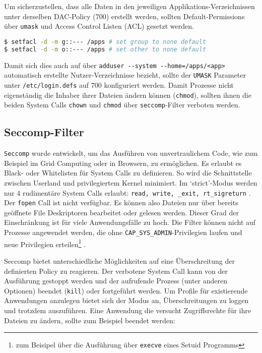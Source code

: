 Um sicherzustellen, dass alle Daten in den jeweiligen Applikations-Verzeichnissen unter derselben DAC-Policy (700) erstellt werden, sollten Default-Permissions über \texttt{umask} und Access Control Listen (ACL) gesetzt werden. 

\begin{lstlisting}[language=bash]
$ setfacl -d -m g::--- /apps # set group to none default
$ setfacl -d -m o::--- /apps # set other to none default
\end{lstlisting}

Damit sich dies auch auf über \texttt{adduser -{}-system -{}-home=/apps/<app>} automatisch erstellte Nutzer-Verzeichnisse bezieht, sollte der \texttt{UMASK} Parameter unter \texttt{/etc/login.defs} auf 700 konfiguriert werden. Damit Prozesse nicht eigenständig die Inhaber ihrer Dateien ändern können (\texttt{chmod}), sollten ihnen die beiden System Calls \texttt{chown} und \texttt{chmod} über \texttt{seccomp}-Filter verboten werden. 

\subsection{Seccomp-Filter}
\label{sec:seccomp}

\texttt{Seccomp} wurde entwickelt, um das Ausführen von unvertraulichem Code, wie zum Beispiel im Grid Computing oder in Browsern, zu ermöglichen. Es erlaubt es Black- oder Whitelisten für System Calls zu definieren. So wird die Schnittstelle zwischen Userland und privilegiertem Kernel minimiert.
Im `strict'-Modus werden nur 4 rudimentäre System Calls erlaubt: \texttt{read, write, \_exit, rt\_sigreturn} \cite{man-seccomp}. Der \texttt{fopen} Call ist nicht verfügbar. Es können also Dateien nur über bereits geöffnete File Deskriptoren bearbeitet oder gelesen werden. Dieser Grad der Einschränkung ist für viele Anwendungsfälle zu hoch.
Die Filter können nicht auf Prozesse angewendet werden, die ohne \texttt{CAP\_SYS\_ADMIN}-Privilegien laufen und neue Privilegien erteilen\footnote{zum Beisipel über die Ausführung über \texttt{execve} eines Setuid Programms} \cite{man-seccomp, man-prctl}.

Seccomp bietet unterschiedliche Möglichkeiten auf eine Überschreitung der definierten Policy zu reagieren. Der verbotene System Call kann von der Ausführung gestoppt werden und der aufrufende Prozess (unter anderen Optionen) beendet (\texttt{kill}) oder fortgeführt werden. Um Profile für existierende Anwendungen anzulegen bietet sich der Modus an, Überschreitungen zu loggen und trotzdem auszuführen. Eine Anwendung die versucht Zugriffsrechte für ihre Dateien zu ändern, sollte zum Beispiel beendet
werden:

